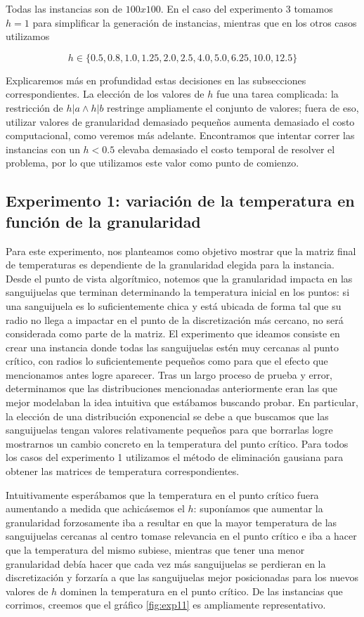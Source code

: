 Todas las instancias son de $100x100$. En el caso del experimento 3 tomamos $h = 1$ para simplificar la generación de instancias, mientras que en los otros casos utilizamos

$$h \in \{0.5, 0.8, 1.0, 1.25, 2.0, 2.5, 4.0, 5.0, 6.25, 10.0, 12.5\}$$

Explicaremos más en profundidad estas decisiones en las subsecciones correspondientes. La elección de los valores de $h$ fue una tarea complicada: la restricción de $h | a \wedge h | b$ restringe ampliamente el conjunto de valores; fuera de eso, utilizar valores de granularidad demasiado pequeños aumenta demasiado el costo computacional, como veremos más adelante. Encontramos que intentar correr las instancias con un $h < 0.5$ elevaba demasiado el costo temporal de resolver el problema, por lo que utilizamos este valor como punto de comienzo.

\subsection{Experimento 1: variación de la temperatura en función de la granularidad}

Para este experimento, nos planteamos como objetivo mostrar que la matriz final de temperaturas es dependiente de la granularidad elegida para la instancia. Desde el punto de vista algorítmico, notemos que la granularidad impacta en las sanguijuelas que terminan determinando la temperatura inicial en los puntos: si una sanguijuela es lo suficientemente chica y está ubicada de forma tal que su radio no llega a impactar en el punto de la discretización más cercano, no será considerada como parte de la matriz. El experimento que ideamos consiste en crear una instancia donde todas las sanguijuelas estén muy cercanas al punto crítico, con radios lo suficientemente pequeños como para que el efecto que mencionamos antes logre aparecer. Tras un largo proceso de prueba y error, determinamos que las distribuciones mencionadas anteriormente eran las que mejor modelaban la idea intuitiva que estábamos buscando probar. En particular, la elección de una distribución exponencial se debe a que buscamos que las sanguijuelas tengan valores relativamente pequeños para que borrarlas logre mostrarnos un cambio concreto en la temperatura del punto crítico. Para todos los casos del experimento 1 utilizamos el método de eliminación gausiana para obtener las matrices de temperatura correspondientes.

Intuitivamente esperábamos que la temperatura en el punto crítico fuera aumentando a medida que achicásemos el $h$: suponíamos que aumentar la granularidad forzosamente iba a resultar en que la mayor temperatura de las sanguijuelas cercanas al centro tomase relevancia en el punto crítico e iba a hacer que la temperatura del mismo subiese, mientras que tener una menor granularidad debía hacer que cada vez más sanguijuelas se perdieran en la discretización y forzaría a que las sanguijuelas mejor posicionadas para los nuevos valores de $h$ dominen la temperatura en el punto crítico. De las instancias que corrimos, creemos que el gráfico \ref{fig:exp11} es ampliamente representativo.

